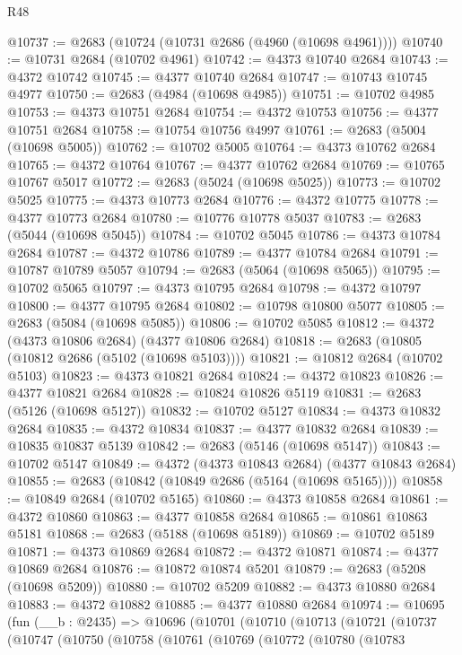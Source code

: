 \begin{lexlean}{R48}
\begin{coremodule}
@10737 := @2683 (@10724 (@10731 @2686 (@4960 (@10698 @4961))))
@10740 := @10731 @2684 (@10702 @4961)
@10742 := @4373 @10740 @2684
@10743 := @4372 @10742
@10745 := @4377 @10740 @2684
@10747 := @10743 @10745 @4977
@10750 := @2683 (@4984 (@10698 @4985))
@10751 := @10702 @4985
@10753 := @4373 @10751 @2684
@10754 := @4372 @10753
@10756 := @4377 @10751 @2684
@10758 := @10754 @10756 @4997
@10761 := @2683 (@5004 (@10698 @5005))
@10762 := @10702 @5005
@10764 := @4373 @10762 @2684
@10765 := @4372 @10764
@10767 := @4377 @10762 @2684
@10769 := @10765 @10767 @5017
@10772 := @2683 (@5024 (@10698 @5025))
@10773 := @10702 @5025
@10775 := @4373 @10773 @2684
@10776 := @4372 @10775
@10778 := @4377 @10773 @2684
@10780 := @10776 @10778 @5037
@10783 := @2683 (@5044 (@10698 @5045))
@10784 := @10702 @5045
@10786 := @4373 @10784 @2684
@10787 := @4372 @10786
@10789 := @4377 @10784 @2684
@10791 := @10787 @10789 @5057
@10794 := @2683 (@5064 (@10698 @5065))
@10795 := @10702 @5065
@10797 := @4373 @10795 @2684
@10798 := @4372 @10797
@10800 := @4377 @10795 @2684
@10802 := @10798 @10800 @5077
@10805 := @2683 (@5084 (@10698 @5085))
@10806 := @10702 @5085
@10812 := @4372 (@4373 @10806 @2684) (@4377 @10806 @2684)
@10818 := @2683 (@10805 (@10812 @2686 (@5102 (@10698 @5103))))
@10821 := @10812 @2684 (@10702 @5103)
@10823 := @4373 @10821 @2684
@10824 := @4372 @10823
@10826 := @4377 @10821 @2684
@10828 := @10824 @10826 @5119
@10831 := @2683 (@5126 (@10698 @5127))
@10832 := @10702 @5127
@10834 := @4373 @10832 @2684
@10835 := @4372 @10834
@10837 := @4377 @10832 @2684
@10839 := @10835 @10837 @5139
@10842 := @2683 (@5146 (@10698 @5147))
@10843 := @10702 @5147
@10849 := @4372 (@4373 @10843 @2684) (@4377 @10843 @2684)
@10855 := @2683 (@10842 (@10849 @2686 (@5164 (@10698 @5165))))
@10858 := @10849 @2684 (@10702 @5165)
@10860 := @4373 @10858 @2684
@10861 := @4372 @10860
@10863 := @4377 @10858 @2684
@10865 := @10861 @10863 @5181
@10868 := @2683 (@5188 (@10698 @5189))
@10869 := @10702 @5189
@10871 := @4373 @10869 @2684
@10872 := @4372 @10871
@10874 := @4377 @10869 @2684
@10876 := @10872 @10874 @5201
@10879 := @2683 (@5208 (@10698 @5209))
@10880 := @10702 @5209
@10882 := @4373 @10880 @2684
@10883 := @4372 @10882
@10885 := @4377 @10880 @2684
@10974 := @10695
    (fun (__b : @2435) =>
    @10696
      (@10701
        (@10710
          (@10713
            (@10721
              (@10737
                (@10747
                  (@10750
                    (@10758
                      (@10761
                        (@10769
                          (@10772
                            (@10780
                              (@10783

\end{coremodule}
\end{lexlean}
